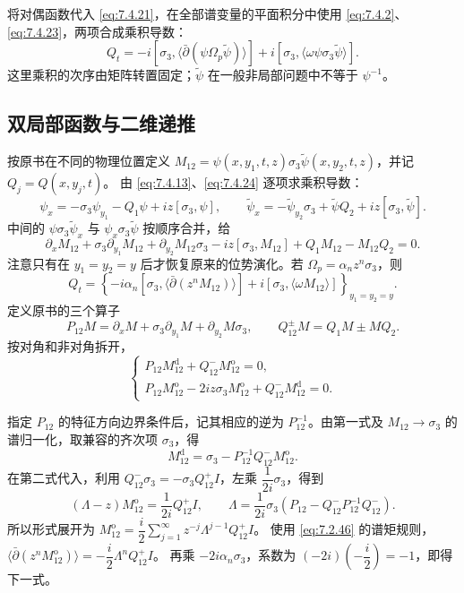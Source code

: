 \documentclass[lang=cn,scheme=chinese,mode=simple,device=normal,color=blue,math=cm,thmcnt=section,12pt]{elegantbook}
\newcommand{\eqq}[2]{\tag{#1}\label{eq:#1}#2}
\begin{document}
将对偶函数代入 \eqref{eq:7.4.21}，在全部谱变量的平面积分中使用 \eqref{eq:7.4.2}、\eqref{eq:7.4.23}，两项合成乘积导数：
\begin{equation}
\eqq{7.4.34}{Q_t=-i[\sigma_3,\langle\bar\partial(\psi\Omega_p\widetilde\psi)\rangle]
+i[\sigma_3,\langle\omega\psi\sigma_3\widetilde\psi\rangle].}
\end{equation}
这里乘积的次序由矩阵转置固定；$\widetilde\psi$ 在一般非局部问题中不等于 $\psi^{-1}$。

\subsection{双局部函数与二维递推}
按原书在不同的物理位置定义
$M_{12}=\psi(x,y_1,t,z)\sigma_3\widetilde\psi(x,y_2,t,z)$，并记 $Q_j=Q(x,y_j,t)$。
由 \eqref{eq:7.4.13}、\eqref{eq:7.4.24} 逐项求乘积导数：
\[
\psi_x=-\sigma_3\psi_{y_1}-Q_1\psi+iz[\sigma_3,\psi],\qquad
\widetilde\psi_x=-\widetilde\psi_{y_2}\sigma_3+\widetilde\psi Q_2+iz[\sigma_3,\widetilde\psi].
\]
中间的 $\psi\sigma_3\widetilde\psi_x$ 与 $\psi_x\sigma_3\widetilde\psi$ 按顺序合并，给
\begin{equation}
\eqq{7.4.35}{\partial_xM_{12}+\sigma_3\partial_{y_1}M_{12}+\partial_{y_2}M_{12}\sigma_3
-iz[\sigma_3,M_{12}]+Q_1M_{12}-M_{12}Q_2=0.}
\end{equation}
注意只有在 $y_1=y_2=y$ 后才恢复原来的位势演化。若 $\Omega_p=\alpha_nz^n\sigma_3$，则
\begin{equation}
\eqq{7.4.36}{Q_t=\left\{-i\alpha_n[\sigma_3,\langle\bar\partial(z^nM_{12})\rangle]
+i[\sigma_3,\langle\omega M_{12}\rangle]\right\}_{y_1=y_2=y}.}
\end{equation}
定义原书的三个算子
\begin{equation}
\eqq{7.4.37}{P_{12}M=\partial_xM+\sigma_3\partial_{y_1}M+\partial_{y_2}M\sigma_3,
\qquad Q_{12}^{\pm}M=Q_1M\pm MQ_2.}
\end{equation}
按对角和非对角拆开，
\begin{equation}
\eqq{7.4.38}{\begin{cases}
P_{12}M_{12}^{\mathrm d}+Q_{12}^-M_{12}^{\mathrm o}=0,\\
P_{12}M_{12}^{\mathrm o}-2iz\sigma_3M_{12}^{\mathrm o}+Q_{12}^-M_{12}^{\mathrm d}=0.
\end{cases}}
\end{equation}
\begin{callout}[计算：消去对角部分并提取时间演化系数]
指定 $P_{12}$ 的特征方向边界条件后，记其相应的逆为 $P_{12}^{-1}$。由第一式及 $M_{12}\to\sigma_3$ 的谱归一化，取兼容的齐次项 $\sigma_3$，得
\[
M_{12}^{\mathrm d}=\sigma_3-P_{12}^{-1}Q_{12}^-M_{12}^{\mathrm o}.
\]
在第二式代入，利用 $Q_{12}^-\sigma_3=-\sigma_3Q_{12}^+I$，左乘 $\dfrac{1}{2i}\sigma_3$，得到
\[
(\Lambda-z)M_{12}^{\mathrm o}=\dfrac{1}{2i}Q_{12}^+I,\qquad
\Lambda=\dfrac{1}{2i}\sigma_3(P_{12}-Q_{12}^-P_{12}^{-1}Q_{12}^-).
\]
所以形式展开为
$M_{12}^{\mathrm o}=\dfrac{i}{2}\displaystyle\sum\limits_{j=1}^\infty z^{-j}\Lambda^{j-1}Q_{12}^+I$。
使用 \eqref{eq:7.2.46} 的谱矩规则，$\langle\bar\partial(z^nM_{12}^{\mathrm o})\rangle=-\dfrac{i}{2}\Lambda^nQ_{12}^+I$。
再乘 $-2i\alpha_n\sigma_3$，系数为 $(-2i)\left(-\dfrac{i}{2}\right)=-1$，即得下一式。
\end{callout}
\end{document}
